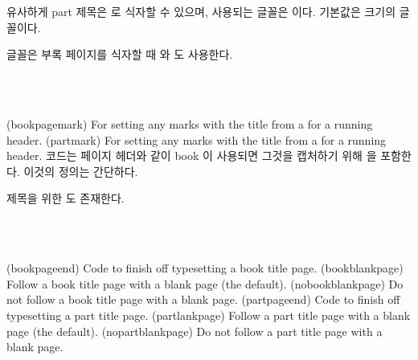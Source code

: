 유사하게 part 제목은 \cmd{\printparttitle}로 식자할 수 있으며, 사용되는 글꼴은
\cmd{\parttitlefont}이다.
기본값은 \cmd{\Huge} 크기의 \cmd{\bfseries} 글꼴이다.

\cmd{\parttitlefont} 글꼴은 부록 페이지를 식자할 때
\cmd{\appendixpage}와 \cmd{\appendixpage*}도 사용한다.

\begin{syntax}
\cmd{\bookpagemark} \\
\cmd{\partmark} \\
\end{syntax}
\glossary(bookpagemark)%
  {}%
  {For setting any marks with the title from a  for a running header.}
\glossary(partmark)%
  {}%
  {For setting any marks with the title from a  for a running header.}
\cmd{\book} 코드는 페이지 헤더와 같이 book 이 사용되면 그것을 캡처하기
위해 \cmd{\bookpagemark}을 포함한다. 이것의 정의는 간단하다.
\begin{lcode}
\newcommand*{\bookpagemark}[1]{}
\end{lcode}
\cmd{\part} 제목을 위한 \cmd{\partmark}도 존재한다.

\begin{syntax}
\cmd{\bookpageend} \cmd{\bookblankpage} \cmd{\nobookblankpage} \\
\cmd{\partpageend} \cmd{\partblankpage} \cmd{\nopartblankpage} \\
\end{syntax}
\glossary(bookpageend)%
  {}%
  {Code to finish off typesetting a book title page.}
\glossary(bookblankpage)%
  {}%
  {Follow a book title page with a blank page (the default).}
\glossary(nobookblankpage)%
  {}%
  {Do not follow a book title page with a blank page.}
\glossary(partpageend)%
  {}%
  {Code to finish off typesetting a part title page.}
\glossary(partlankpage)%
  {}%
  {Follow a part title page with a blank page (the default).}
\glossary(nopartblankpage)%
  {}%
  {Do not follow a part title page with a blank page.}

